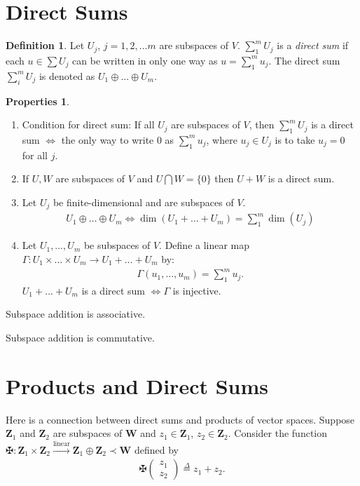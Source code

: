 \documentclass{book}
\theoremstyle{definition}
\newtheorem{defn}{Definition}[section]
\newtheorem{prop}{Properties}[section]
\newcommand{\W}{\mathbf{W}}
\newcommand{\Z}{\mathbf{Z}}
\newcommand{\lin}{\overset{\text{linear}}{\longrightarrow}}
\begin{document}
\section{Direct Sums}
\begin{defn}
	Let $U_j$, $j=1,2,\dots m$ are subspaces of $V$. $\sum_1^m U_j$ is a \textit{direct sum} if each $u \in \sum U_j$ can be written in only one way as $u = \sum_1^m u_j$. The direct sum $\sum^m_i U_j$ is denoted as $U_1 \oplus\dots\oplus U_m$.
\end{defn}
\begin{prop}
	$\,$
	\begin{enumerate}
		\item Condition for direct sum: If all $U_j$ are subspaces of $V$, then $\sum_1^m U_j$ is a direct sum $\iff$ the only way to write 0 as $\sum_1^m u_j$, where $u_j \in U_j$ is to take $u_j = 0$ for all $j$.  
		\item If $U, W$ are subspaces of $V$ and $U \bigcap W = \{ 0\}$ then $U+W$ is a direct sum. 
		
		\item Let $U_j$ be finite-dimensional and are subspaces of $V$. 
		\begin{align*}
		U_1 \oplus \dots\oplus U_m \iff \dim(U_1+\dots+U_m) = \sum_1^m\dim(U_j)
		\end{align*}
		
		\item Let $U_1,\dots,U_m$ be subspaces of $V$. Define a linear map $\Gamma : U_1\times\dots\times U_m \rightarrow U_1 + \dots + U_m$ by:
		\begin{align*}
		\Gamma(u_1,\dots,u_m) = \sum_1^m u_j.
		\end{align*}
		$U_1 + \dots + U_m$ is a direct sum $\iff \Gamma$ is injective. 
	\end{enumerate}


		\item Subspace addition is associative.
		
		\item Subspace addition is commutative.
\end{prop}



\section{Products and Direct Sums}


Here is a connection between direct sums and products of vector spaces. Suppose $\Z_1$ and $\Z_2$ are subspaces of $\W$ and $z_1 \in \Z_1$, $z_2 \in \Z_2$. Consider the function $\maltese : \Z_1 \times \Z_2 \lin \Z_1 \oplus \Z_2 \prec \W$ defined by
\begin{align}
\maltese \begin{pmatrix}
z_1\\z_2
\end{pmatrix} \stackrel{\Delta}{=} z_1 + z_2.
\end{align}
\end{document}
